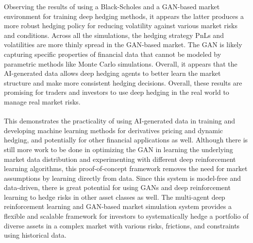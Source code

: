 \noindent Observing the results of using a Black-Scholes and a GAN-based market environment for training deep hedging methods, it appears the latter produces a more robust hedging policy for reducing volatility against various market risks and conditions. Across all the simulations, the hedging strategy PnLs and volatilities are more thinly spread in the GAN-based market. The GAN is likely capturing specific properties of financial data that cannot be modeled by parametric methods like Monte Carlo simulations. Overall, it appears that the AI-generated data allows deep hedging agents to better learn the market structure and make more consistent hedging decisions. Overall, these results are promising for traders and investors to use deep hedging in the real world to manage real market risks.
\\ \\
This demonstrates the practicality of using AI-generated data in training and developing machine learning methods for derivatives pricing and dynamic hedging, and potentially for other financial applications as well. Although there is still more work to be done in optimizing the GAN in learning the underlying market data distribution and experimenting with different deep reinforcement learning algorithms, this proof-of-concept framework removes the need for market assumptions by learning directly from data. Since this system is model-free and data-driven, there is great potential for using GANs and deep reinforcement learning to hedge risks in other asset classes as well. The multi-agent deep reinforcement learning and GAN-based market simulation system provides a flexible and scalable framework for investors to systematically hedge a portfolio of diverse assets in a complex market with various risks, frictions, and constraints using historical data.